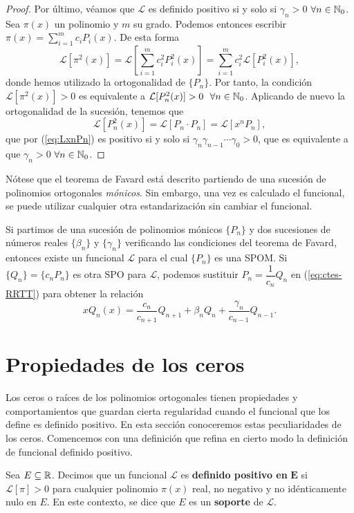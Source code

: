 \begin{proof}
    Por último, véamos que $\mathcal{L}$ es definido positivo si y solo si $\gamma_n >0$ $\forall n\in \mathbb{N}_0$. Sea $\pi(x)$ un polinomio y $m$ su grado. Podemos entonces escribir $\pi(x)=\sum_{i=1}^m c_i P_i(x)$. De esta forma
    $$
    \mathcal{L}[\pi^2(x)]=\mathcal{L}[\sum_{i=1}^m c_i^2 P_i^2(x)]= \sum_{i=1}^m  c_i^2 \mathcal{L}[P_i^2(x)],
    $$
    donde hemos utilizado la ortogonalidad de $\{P_n\}$. Por tanto, la condición $\mathcal{L}[\pi^2(x)]>0$ es equivalente a $\mathcal{L}[P_n^2(x)]>0 \ \ \forall n\in\N_0$. Aplicando de nuevo la ortogonalidad de la sucesión, tenemos que
    $$
    \mathcal{L}[P_n^2(x)] = \mathcal{L}[P_n\cdot P_n] =\mathcal{L}[x^n P_n],
    $$
    que por (\ref{eq:LxnPn}) es positivo si y solo si $\gamma_n\gamma_{n-1}\cdots\gamma_0>0$, que es equivalente a que $\gamma_n>0$ $\forall n\in\mathbb{N}_0$.
\end{proof}

\begin{observacion}
    Nótese que el teorema de Favard está descrito partiendo de una sucesión de polinomios ortogonales \textit{mónicos}. Sin embargo, una vez es calculado el funcional, se puede utilizar cualquier otra estandarización sin cambiar el funcional. 

    Si partimos de una sucesión de polinomios mónicos $\{P_n\}$ y dos sucesiones de números reales $\{\beta_n\}$ y $\{\gamma_n\}$ verificando las condiciones del teorema de Favard, entonces existe un funcional $\mathcal L$ para el cual $\{P_n\}$ es una SPOM. Si $\{Q_n\}=\{c_n P_n\}$ es otra SPO para $\mathcal L$, podemos sustituir $P_n = \dfrac 1 {c_n} Q_n$ en (\ref{eq:ctes-RRTT}) para obtener la relación 
    $$
    xQ_n(x) = \dfrac{c_n}{c_{n+1}}Q_{n+1} + \beta_n Q_n + \dfrac{\gamma_n}{c_{n-1}}Q_{n-1}.
    $$

\end{observacion}

\section{Propiedades de los ceros}

Los ceros o raíces de los polinomios ortogonales tienen propiedades y comportamientos que guardan cierta regularidad cuando el funcional que los define es definido positivo. En esta sección conoceremos estas peculiaridades de los ceros. Comencemos con una definición que refina en cierto modo la definición de funcional definido positivo.

\begin{definicion}
    Sea $E\subseteq \mathbb{R}$. Decimos que un funcional $\mathcal{L}$ es \textbf{definido positivo en} $\mathbf E$ si $\mathcal{L}[\pi]>0$ para cualquier polinomio $\pi(x)$ real, no negativo y no idénticamente nulo en $E$. En este contexto, se dice que $E$ es un \textbf{soporte} de $\mathcal{L}$.
    
\end{definicion}

